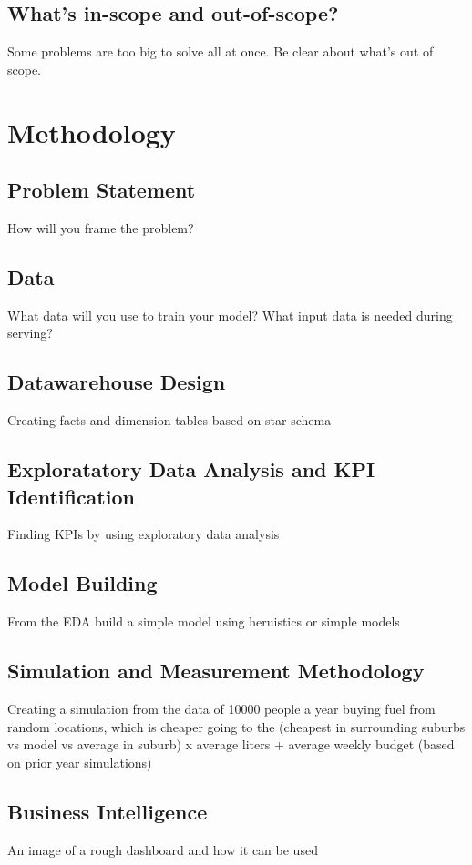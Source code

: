 \documentclass[10pt]{article} %
\begin{document}
\subsection{What's in-scope and out-of-scope?}
Some problems are too big to solve all at once. Be clear about what's out of scope.

\section{Methodology}

\subsection{Problem Statement}
How will you frame the problem?

\subsection{Data }
What data will you use to train your model? What input data is needed during serving?

\subsection{Datawarehouse Design}
Creating facts and dimension tables based on star schema 

\subsection{Exploratatory Data Analysis and KPI Identification}
Finding KPIs by using exploratory data analysis

\subsection{Model Building}
From the EDA build a simple model using heruistics or simple models

\subsection{Simulation and Measurement Methodology}
Creating a simulation from the data of 10000 people a year buying fuel from random locations, which is cheaper going to the (cheapest in  surrounding suburbs vs model vs average in suburb) x average liters + average weekly budget (based on prior year simulations)

\subsection{Business Intelligence}
An image of a rough dashboard and how it can be used
\end{document}
